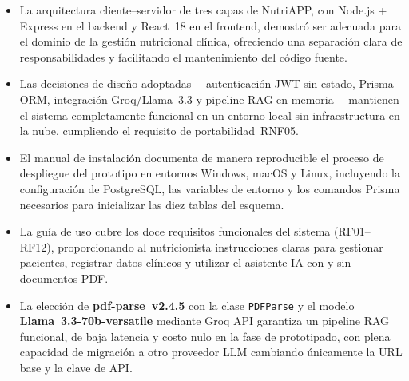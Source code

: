 \documentclass[12pt,a4paper]{article}
\begin{document}
\begin{itemize}[leftmargin=1.5em]
  \item La arquitectura cliente--servidor de tres capas de NutriAPP, con Node.js +
        Express en el backend y React~18 en el frontend, demostró ser adecuada para
        el dominio de la gestión nutricional clínica, ofreciendo una separación clara
        de responsabilidades y facilitando el mantenimiento del código fuente.

  \item Las decisiones de diseño adoptadas ---autenticación JWT sin estado, Prisma ORM,
        integración Groq/Llama~3.3 y pipeline RAG en memoria--- mantienen el sistema
        completamente funcional en un entorno local sin infraestructura en la nube,
        cumpliendo el requisito de portabilidad~RNF05.

  \item El manual de instalación documenta de manera reproducible el proceso de
        despliegue del prototipo en entornos Windows, macOS y Linux, incluyendo la
        configuración de PostgreSQL, las variables de entorno y los comandos Prisma
        necesarios para inicializar las diez tablas del esquema.

  \item La guía de uso cubre los doce requisitos funcionales del sistema (RF01--RF12),
        proporcionando al nutricionista instrucciones claras para gestionar pacientes,
        registrar datos clínicos y utilizar el asistente IA con y sin documentos PDF.

  \item La elección de \textbf{pdf-parse~v2.4.5} con la clase \texttt{PDFParse} y el
        modelo \textbf{Llama~3.3-70b-versatile} mediante Groq API garantiza un pipeline
        RAG funcional, de baja latencia y costo nulo en la fase de prototipado, con
        plena capacidad de migración a otro proveedor LLM cambiando únicamente la
        URL base y la clave de API.
\end{itemize}

\clearpage
\end{document}
